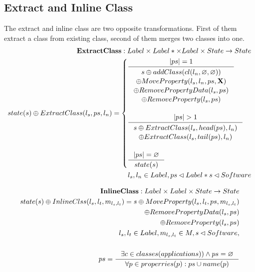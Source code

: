 \documentclass[11pt]{article}
\begin{document}
\subsection{Extract and Inline Class}
The extract and inline class are two opposite transformations. First of them extract a class from existing class, second of them merges two classes into one.
\begin{align*}
	\mathbf{ExtractClass} : Label \times Label* \times Label \times State \rightarrow State \\
	state(s) \oplus ExtractClass(l_s, ps, l_n) = \begin{cases}
	\inference{|ps| = 1}{\begin{gathered}
		s \oplus addClass(cl(l_n, \varnothing, \varnothing)) \\ \oplus MoveProperty(l_s, l_n, ps, \mathbf{X}) \\ \oplus RemovePropertyData(l_s, ps) \\ \oplus RemoveProperty(l_s, ps)  
\end{gathered}}\\\\
	\inference{|ps| > 1}{\begin{gathered}
		s \oplus ExtractClass(l_s, head(ps), l_n) \\\oplus ExtractClass(l_s, tail(ps), l_n)
\end{gathered}}\\\\
	\inference{|ps| = \varnothing}{state(s)}	 
 \end{cases}
	\\
	l_s, l_n \in Label, ps \lhd Label* s \lhd Software 
\end{align*}

\begin{align*}
	\mathbf{InlineClass} : Label \times Label \times State \rightarrow State \\
	state(s) \oplus InlineClss(l_s, l_t, m_{l_s, l_t}) = s \oplus MoveProperty(l_s, l_t, ps, m_{l_s, l_t}) \\ \oplus RemovePropertyData(l_s, ps) \\ \oplus RemoveProperty(l_s, ps)  
\\
l_s, l_t \in Label, m_{l_s, l_t} \in M, s \lhd Software, \\ \\
ps = \inference{\exists c \in classes(applications)) \wedge ps = \varnothing}{\forall p \in properries(p) : ps \cup name(p)}
\end{align*}
 
\end{document}
